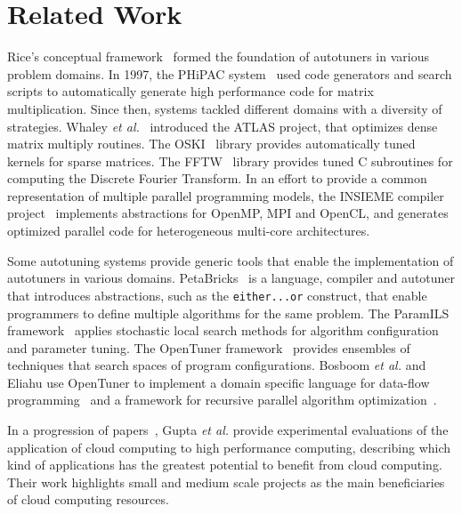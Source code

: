 \documentclass[12pt]{article}
\begin{document}
\section{Related Work} \label{sec:related}

Rice's conceptual framework~\cite{rice1976algorithm} formed the foundation
of autotuners in various problem domains.  In 1997, the PHiPAC
system~\cite{bilmes1997phipac} used code generators and search scripts to
automatically generate high performance code
for matrix multiplication. Since then, systems tackled different domains with a
diversity of strategies. Whaley \emph{et al.}~\cite{whaley1998atlas} introduced
the ATLAS project, that optimizes dense matrix multiply routines. The
OSKI~\cite{vuduc2005oski} library provides automatically tuned kernels for
sparse matrices. The FFTW~\cite{frigo1998fftw} library provides tuned C
subroutines for computing the Discrete Fourier Transform.  In an effort to
provide a common representation of multiple parallel programming models, the
INSIEME compiler project~\cite{jordan2012multi} implements abstractions for
OpenMP, MPI and OpenCL, and generates optimized parallel code for heterogeneous
multi-core architectures.

Some autotuning systems provide generic tools that enable the implementation of
autotuners in various domains. PetaBricks~\cite{ansel2009petabricks} is a
language, compiler and autotuner that introduces abstractions, such as the
\texttt{\footnotesize either...or} construct, that enable programmers to define
multiple algorithms for the same problem.  The ParamILS
framework~\cite{hutter2009paramils} applies stochastic local search methods
for algorithm configuration and parameter tuning.  The OpenTuner
framework~\cite{ansel2014opentuner} provides ensembles of techniques that
search spaces of program configurations. Bosboom \emph{et al.} and Eliahu use
OpenTuner to implement a domain specific language for data-flow
programming~\cite{bosboom2014streamjit} and a framework for recursive parallel
algorithm optimization~\cite{eliahu2015frpa}.

In a progression of papers~\cite{gupta2012exploring,gupta2014evaluating,gupta2013hpccloud},
Gupta \emph{et al.} provide experimental evaluations of the application of
cloud computing to high performance computing, describing which kind of
applications has the greatest potential to benefit from cloud computing.
Their work highlights small and medium scale projects as the main beneficiaries
of cloud computing resources.
\end{document}
